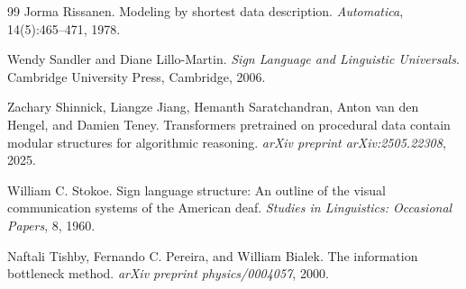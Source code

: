 \documentclass[11pt]{article}
\begin{document}
\begin{thebibliography}{99}
Jorma Rissanen.
\newblock Modeling by shortest data description.
\newblock \emph{Automatica}, 14(5):465--471, 1978.

Wendy Sandler and Diane Lillo-Martin.
\newblock \emph{Sign Language and Linguistic Universals}.
\newblock Cambridge University Press, Cambridge, 2006.

Zachary Shinnick, Liangze Jiang, Hemanth Saratchandran, Anton van den Hengel, and Damien Teney.
\newblock Transformers pretrained on procedural data contain modular structures for algorithmic reasoning.
\newblock \emph{arXiv preprint arXiv:2505.22308}, 2025.

William C. Stokoe.
\newblock Sign language structure: An outline of the visual communication systems of the American deaf.
\newblock \emph{Studies in Linguistics: Occasional Papers}, 8, 1960.

Naftali Tishby, Fernando C. Pereira, and William Bialek.
\newblock The information bottleneck method.
\newblock \emph{arXiv preprint physics/0004057}, 2000.

\end{thebibliography}
\end{document}
